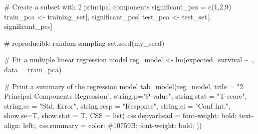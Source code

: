 \documentclass[
  letterpaper,
  DIV=11,
  numbers=noendperiod]{scrreprt}
\newenvironment{Shaded}{\begin{snugshade}}{\end{snugshade}}
\newcommand{\AttributeTok}[1]{\textcolor[rgb]{0.40,0.45,0.13}{#1}}
\newcommand{\CommentTok}[1]{\textcolor[rgb]{0.37,0.37,0.37}{#1}}
\newcommand{\DecValTok}[1]{\textcolor[rgb]{0.68,0.00,0.00}{#1}}
\newcommand{\FunctionTok}[1]{\textcolor[rgb]{0.28,0.35,0.67}{#1}}
\newcommand{\NormalTok}[1]{\textcolor[rgb]{0.00,0.23,0.31}{#1}}
\newcommand{\OtherTok}[1]{\textcolor[rgb]{0.00,0.23,0.31}{#1}}
\newcommand{\SpecialCharTok}[1]{\textcolor[rgb]{0.37,0.37,0.37}{#1}}
\newcommand{\StringTok}[1]{\textcolor[rgb]{0.13,0.47,0.30}{#1}}
\begin{document}
\begin{Shaded}
\begin{Highlighting}[]
\CommentTok{\# Create a subset with 2 principal components}
\NormalTok{significant\_pcs }\OtherTok{=} \FunctionTok{c}\NormalTok{(}\DecValTok{1}\NormalTok{,}\DecValTok{2}\NormalTok{,}\DecValTok{9}\NormalTok{)}
\NormalTok{train\_pca }\OtherTok{\textless{}{-}}\NormalTok{ training\_set[, significant\_pcs]}
\NormalTok{test\_pca }\OtherTok{\textless{}{-}}\NormalTok{ test\_set[, significant\_pcs]}
\end{Highlighting}
\end{Shaded}

\begin{Shaded}
\begin{Highlighting}[]
\CommentTok{\# reproducible random sampling}
\FunctionTok{set.seed}\NormalTok{(my\_seed)}

\CommentTok{\# Fit a multiple linear regression model}
\NormalTok{reg\_model }\OtherTok{\textless{}{-}} \FunctionTok{lm}\NormalTok{(expected\_survival }\SpecialCharTok{\textasciitilde{}}\NormalTok{ ., }
                \AttributeTok{data =}\NormalTok{ train\_pca)}

\CommentTok{\# Print a summary of the regression model}
\FunctionTok{tab\_model}\NormalTok{(reg\_model, }\AttributeTok{title =} \StringTok{"2 Principal Components Regression"}\NormalTok{,}
          \AttributeTok{string.p=}\StringTok{"P{-}value"}\NormalTok{, }\AttributeTok{string.stat =} \StringTok{"T{-}score"}\NormalTok{,}
          \AttributeTok{string.se =} \StringTok{"Std. Error"}\NormalTok{,}
          \AttributeTok{string.resp =} \StringTok{"Response"}\NormalTok{,}
          \AttributeTok{string.ci =} \StringTok{"Conf Int."}\NormalTok{,}
          \AttributeTok{show.se=}\NormalTok{T, }\AttributeTok{show.stat =}\NormalTok{ T,}
          \AttributeTok{CSS =} \FunctionTok{list}\NormalTok{(}
             \AttributeTok{css.depvarhead =} \StringTok{\textquotesingle{}font{-}weight: bold; text{-}align: left;\textquotesingle{}}\NormalTok{,}
             \AttributeTok{css.summary =} \StringTok{\textquotesingle{}color: \#10759B; font{-}weight: bold;\textquotesingle{}}
\NormalTok{           ))}
\end{Highlighting}
\end{Shaded}
\end{document}
